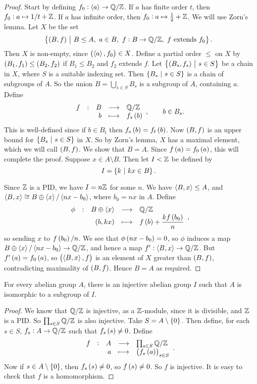 \begin{proof}
Start by defining $ f_0 : \left\langle a \right\rangle \to \mathbb{Q} / \mathbb{Z} $. If $ a $ has finite order $ t $, then $ f_0 : a \mapsto 1 / t + \mathbb{Z} $. If $ a $ has infinite order, then $ f_0 : a \mapsto \tfrac{1}{2} + \mathbb{Z} $. We will use Zorn's lemma. Let $ X $ be the set
$$ \cbr{\br{B, f} \st B \le A, \ a \in B, \ f : B \to \QQ / \ZZ, \ f \ \text{extends} \ f_0}. $$
Then $ X $ is non-empty, since $ \br{\abr{a}, f_0} \in X $. Define a partial order $ \le $ on $ X $ by $ \br{B_1, f_1} \le \br{B_2, f_2} $ if $ B_1 \le B_2 $ and $ f_2 $ extends $ f $. Let $ \cbr{\br{B_s, f_s} \st s \in S} $ be a chain in $ X $, where $ S $ is a suitable indexing set. Then $ \cbr{B_s \st s \in S} $ is a chain of subgroups of $ A $. So the union $ B = \bigcup_{s \in S} B_s $ is a subgroup of $ A $, containing $ a $. Define
$$ \function[f]{B}{\QQ / \ZZ}{b}{f_s\br{b}}, \qquad b \in B_s. $$
This is well-defined since if $ b \in B_t $ then $ f_s\br{b} = f_t\br{b} $. Now $ \br{B, f} $ is an upper bound for $ \cbr{B_s \st s \in S} $ in $ X $. So by Zorn's lemma, $ X $ has a maximal element, which we will call $ \br{B, f} $. We show that $ B = A $. Since $ f\br{a} = f_0\br{a} $, this will complete the proof. Suppose $ x \in A \setminus B $. Then let $ I < \mathbb{Z} $ be defined by
$$ I = \cbr{k \st kx \in B}. $$

\pagebreak

Since $ \mathbb{Z} $ is a PID, we have $ I = n\mathbb{Z} $ for some $ n $. We have $ \left\langle B, x \right\rangle \le A $, and $ \left\langle B, x \right\rangle \cong B \oplus \left\langle x \right\rangle / \left\langle nx - b_0 \right\rangle $, where $ b_0 = nx $ in $ A $. Define
$$ \function[\phi]{B \oplus \abr{x}}{\QQ / \ZZ}{\br{b, kx}}{f\br{b} + \dfrac{kf\br{b_0}}{n}}, $$
so sending $ x $ to $ f\br{b_0} / n $. We see that $ \phi\br{nx - b_0} = 0 $, so $ \phi $ induces a map $ B \oplus \left\langle x \right\rangle / \left\langle nx - b_0 \right\rangle \to \mathbb{Q} / \mathbb{Z} $, and hence a map $ f' : \left\langle B, x \right\rangle \to \mathbb{Q} / \mathbb{Z} $. But $ f'\br{a} = f_0\br{a} $, so $ \br{\abr{B, x}, f} $ is an element of $ X $ greater than $ \br{B, f} $, contradicting maximality of $ \br{B, f} $. Hence $ B = A $ as required.
\end{proof}


\begin{proposition}
For every abelian group $ A $, there is an injective abelian group $ I $ such that $ A $ is isomorphic to a subgroup of $ I $.
\end{proposition}

\begin{proof}
We know that $ \mathbb{Q} / \mathbb{Z} $ is injective, as a $ \mathbb{Z} $-module, since it is divisible, and $ \mathbb{Z} $ is a PID. So $ \prod_{s \in S} \mathbb{Q} / \mathbb{Z} $ is also injective. Take $ S = A \setminus \cbr{0} $. Then define, for each $ s \in S $, $ f_s : A \to \mathbb{Q} / \mathbb{Z} $ such that $ f_s\br{s} \ne 0 $. Define
$$ \function[f]{A}{\prod_{s \in S} \QQ / \ZZ}{a}{\br{f_s\br{a}}_{s \in S}}. $$
Now if $ s \in A \setminus \cbr{0} $, then $ f_s\br{s} \ne 0 $, so $ f\br{s} \ne 0 $. So $ f $ is injective. It is easy to check that $ f $ is a homomorphism.
\end{proof}

